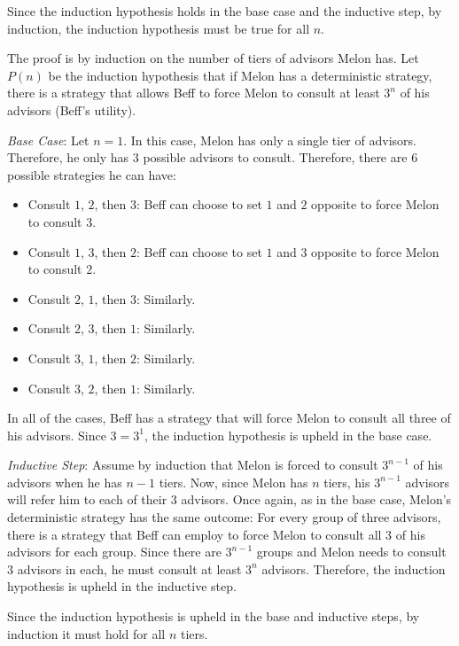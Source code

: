 \documentclass[12pt,twoside]{article}
\begin{document}
\begin{problems}
\begin{problemparts}
Since the induction hypothesis holds in the base case and the inductive step,
by induction, the induction hypothesis must be true for all $n$.

\problempart %

The proof is by induction on the number of tiers of advisors Melon has. Let
$P(n)$ be the induction hypothesis that if Melon has a deterministic
strategy, there is a strategy that allows Beff to force Melon to consult at
least $3^n$ of his advisors (Beff's utility).

{\it Base Case}: Let $n = 1$. In this case, Melon has only a single tier of
advisors. Therefore, he only has $3$ possible advisors to consult. Therefore,
there are $6$ possible strategies he can have:

\begin{itemize}
  \item Consult $1$, $2$, then $3$: Beff can choose to set $1$ and $2$
  opposite to force Melon to consult $3$.
  \item Consult $1$, $3$, then $2$: Beff can choose to set $1$ and $3$
  opposite to force Melon to consult $2$.
  \item Consult $2$, $1$, then $3$: Similarly.
  \item Consult $2$, $3$, then $1$: Similarly.
  \item Consult $3$, $1$, then $2$: Similarly.
  \item Consult $3$, $2$, then $1$: Similarly.
\end{itemize}

In all of the cases, Beff has a strategy that will force Melon to consult all
three of his advisors. Since $3 = 3^1$, the induction hypothesis is upheld in
the base case.

{\it Inductive Step}: Assume by induction that Melon is forced to consult
$3^{n - 1}$ of his advisors when he has $n - 1$ tiers. Now, since Melon has
$n$ tiers, his $3^{n - 1}$ advisors will refer him to each of their $3$
advisors. Once again, as in the base case, Melon's deterministic strategy has
the same outcome: For every group of three advisors, there is a strategy that
Beff can employ to force Melon to consult all $3$ of his advisors for each
group. Since there are $3^{n - 1}$ groups and Melon needs to consult $3$
advisors in each, he must consult at least $3^n$ advisors. Therefore, the
induction hypothesis is upheld in the inductive step.

Since the induction hypothesis is upheld in the base and inductive steps, by
induction it must hold for all $n$ tiers.


\end{problemparts}
\end{problems}
\end{document}
